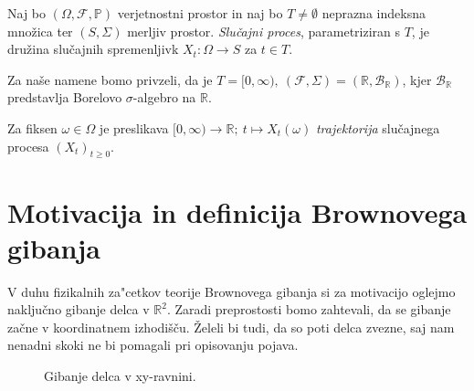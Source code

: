 \documentclass[twoside,11pt]{article}
\begin{document}
\begin{definicija}
    Naj bo $(\Omega, \mathcal{F}, \mathbb{P})$ verjetnostni prostor in naj bo $T\neq\emptyset$ neprazna
    indeksna množica ter $(S, \Sigma)$ merljiv prostor. \textit{Slučajni proces}, parametriziran
    s $T$, je družina slučajnih spremenljivk $X_t : \Omega \to S$ za $t \in T$.
\end{definicija}

\begin{opomba}
    Za naše namene bomo privzeli, da je $T = [0, \infty), \ (\mathcal{F}, \Sigma) = (\mathbb{R}, \mathcal{B}_{\mathbb{R}})$,
    kjer $\mathcal{B}_{\mathbb{R}}$ predstavlja Borelovo $\sigma$-algebro na $\mathbb{R}$. 
\end{opomba}
    
\begin{definicija}
    Za fiksen $\omega \in \Omega$ je preslikava 
    $[0, \infty) \rightarrow \mathbb{R}; \ t \mapsto X_t(\omega)$ 
    \textit{trajektorija} slučajnega procesa $(X_t)_{t\geq0}$.
\end{definicija}


\pagebreak

\section{Motivacija in definicija Brownovega gibanja}

V duhu fizikalnih za"cetkov teorije Brownovega gibanja si za motivacijo oglejmo naključno gibanje delca v $\mathbb{R}^2$.
Zaradi preprostosti bomo zahtevali, da se gibanje začne v koordinatnem izhodišču. Želeli bi tudi, da so 
poti delca zvezne, saj nam nenadni skoki ne bi pomagali pri opisovanju pojava.  

\begin{figure}[h]
    \centering

    \caption{Gibanje delca v xy-ravnini.}
    \label{fig:slika1}
\end{figure}
\end{document}
